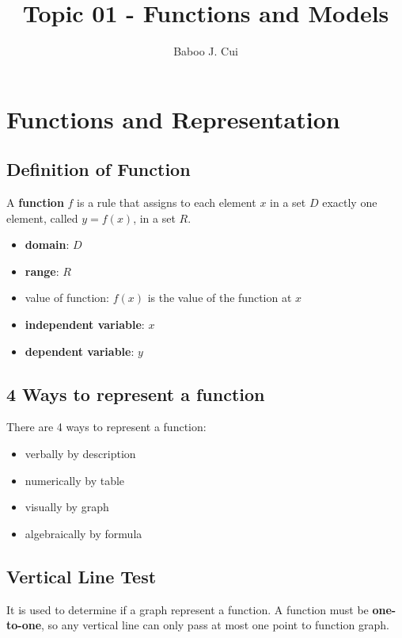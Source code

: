 \documentclass[10pt,a4paper,oneside]{article}
\author{Baboo J. Cui}
\title{Topic 01 - Functions and Models}
\begin{document}
\maketitle
\tableofcontents

\newpage

\section{Functions and Representation}

\subsection{Definition of Function}
A \textbf{function} $f$ is a rule that assigns to each element $x$ in a set $D$ exactly one element, called $y = f(x)$, in a set $R$.
\begin{itemize}
	\item \textbf{domain}: $D$
	\item \textbf{range}: $R$
	\item value of function: $f(x)$ is the value of the function at $x$
	\item \textbf{independent variable}: $x$
	\item \textbf{dependent variable}: $y$
\end{itemize}

\subsection{4 Ways to represent a function}
There are 4 ways to represent a function:
\begin{itemize}
	\item verbally by description
	\item numerically by table
	\item visually by graph
	\item algebraically by formula
\end{itemize}

\subsection{Vertical Line Test}
It is used to determine if a graph represent a function. A function must be \textbf{one-to-one}, so any vertical line can only pass at most one point to function graph.
\end{document}
